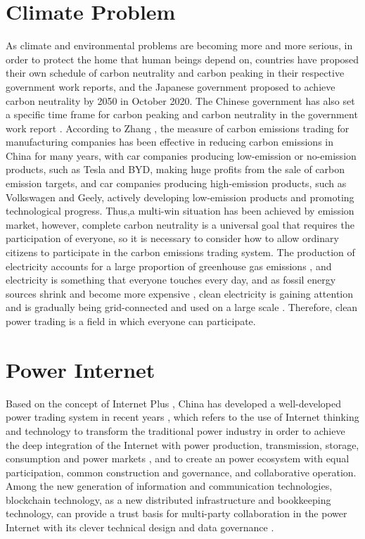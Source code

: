 \section{Climate Problem}
As climate and environmental problems are becoming more and more serious, in order to protect the home that human beings depend on, countries have proposed their own schedule of carbon neutrality and carbon peaking in their respective government work reports, and the Japanese government proposed to achieve carbon neutrality by 2050 in October 2020\cite{japanesereport}. The Chinese government has also set a specific time frame for carbon peaking and carbon neutrality in the government work report \cite{chinareport}. According to Zhang \cite{Zhang2020}, the measure of carbon emissions trading for manufacturing companies has been effective in reducing carbon emissions in China for many years, with car companies producing low-emission or no-emission products, such as Tesla and BYD, making huge profits from the sale of carbon emission targets, and car companies producing high-emission products, such as Volkswagen and Geely, actively developing low-emission products and promoting technological progress. Thus,a multi-win situation has been achieved by emission market, however, complete carbon neutrality is a universal goal that requires the participation of everyone, so it is necessary to consider how to allow ordinary citizens to participate in the carbon emissions trading system. The production of electricity accounts for a large proportion of greenhouse gas emissions \cite{Zhu2020}, and electricity is something that everyone touches every day, and as fossil energy sources shrink and become more expensive \cite{Li2021}, clean electricity is gaining attention and is gradually being grid-connected and used on a large scale \cite{Sifat2019}. Therefore, clean power trading is a field in which everyone can participate.

\section{Power Internet}
Based on the concept of Internet Plus \cite{internetplus2016}, China has developed a well-developed power trading system in recent years \cite{energyinternet2015}, which refers to the use of Internet thinking and technology to transform the traditional power industry in order to achieve the deep integration of the Internet with power production, transmission, storage, consumption and power markets \cite{defenergyinternet}, and to create an power ecosystem with equal participation, common construction and governance, and collaborative operation. Among the new generation of information and communication technologies, blockchain technology, as a new distributed infrastructure and bookkeeping technology, can provide a trust basis for multi-party collaboration in the power Internet with its clever technical design and data governance \cite{Bao2020}.


